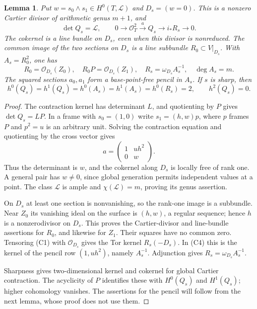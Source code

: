 \documentclass[11pt]{article}
\newtheorem{lemma}[theorem]{Lemma}
\theoremstyle{definition}\newtheorem{definition}[theorem]{Definition}
\theoremstyle{remark}\newtheorem{remark}[theorem]{Remark}
\newcommand{\OO}{\mathcal O}
\begin{document}
\begin{lemma}\label{lem:curve-sequences}
Put $w=s_0\wedge s_1\in H^0(T,\mathcal L)$ and
$D_s=(w=0)$. This is a nonzero Cartier divisor of arithmetic genus $m+1$, and
\[
 \det Q_s=\mathcal L,\qquad
 0\to\OO_T^2\xrightarrow{a}Q_s\to i_*R_s\to0.                 \tag{C1}
\]
The cokernel is a line bundle on $D_s$, even when this divisor is nonreduced. The common image of the two sections on $D_s$ is a line subbundle $R_0\subset V|_{D_s}$. With $A_s=R_0^2$, one has
\[
 R_0=\OO_{D_s}(Z_0),\quad R_0P=\OO_{D_s}(Z_1),\quad
 R_s=\omega_{D_s}A_s^{-1},\quad\deg A_s=m.                  \tag{C2}
\]
The squared sections $a_0,a_1$ form a base-point-free pencil in $A_s$. If $s$ is sharp, then
\[
 h^0(Q_s)=h^1(Q_s)=h^0(A_s)=h^1(A_s)=h^0(R_s)=2,\qquad h^2(Q_s)=0.
                                                                    \tag{C3}
\]
\end{lemma}
\begin{proof}
The contraction kernel has determinant $L$, and quotienting by $P$ gives $\det Q_s=LP$. In a frame with $s_0=(1,0)$ write $s_1=(h,w)p$, where $p$ frames $P$ and $p^2=u$ is an arbitrary unit. Solving the contraction equation and quotienting by the cross vector gives
\[
                       a=\begin{pmatrix}1&uh^2\\0&w\end{pmatrix}.
                                                                    \tag{C4}
\]
Thus the determinant is $w$, and the cokernel along $D_s$ is locally free of rank one. A general pair has $w\ne0$, since global generation permits independent values at a point. The class $\mathcal L$ is ample and $\chi(\mathcal L)=m$, proving its genus assertion.

On $D_s$ at least one section is nonvanishing, so the rank-one image is a subbundle. Near $Z_0$ its vanishing ideal on the surface is $(h,w)$, a regular sequence; hence $h$ is a nonzerodivisor on $D_s$. This proves the Cartier-divisor and line-bundle assertions for $R_0$, and likewise for $Z_1$. Their squares have no common zero. Tensoring (C1) with $\OO_{D_s}$ gives the Tor kernel $R_s(-D_s)$. In (C4) this is the kernel of the pencil row $(1,uh^2)$, namely $A_s^{-1}$. Adjunction gives $R_s=\omega_{D_s}A_s^{-1}$.

Sharpness gives two-dimensional kernel and cokernel for global Cartier contraction. The acyclicity of $P$ identifies these with $H^0(Q_s)$ and $H^1(Q_s)$; higher cohomology vanishes. The assertions for the pencil will follow from the next lemma, whose proof does not use them.
\end{proof}
\end{document}
